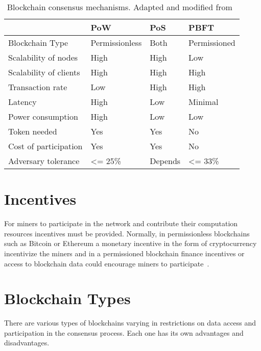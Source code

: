 \begin{table}[!ht]
  \centering
  \begin{tabular}{|l|l|l|l|}
    \hline
    & PoW &	PoS &	PBFT \\ \hline
    Blockchain Type &	Permissionless &	Both &	Permissioned \\ \hline
    Scalability of nodes &	High &	High &	Low \\ \hline
    Scalability of clients &	High &	High &	High \\ \hline
    Transaction rate &	Low &	High &	High \\ \hline
    Latency &	High &	Low &	Minimal \\ \hline
    Power consumption &	High &	Low &	Low \\ \hline
    Token needed &	Yes &	Yes &	No \\ \hline
    Cost of participation &	Yes &	Yes &	No \\ \hline
    Adversary tolerance &	<= 25\%	& Depends &	<= 33\% \\ \hline
  \end{tabular}
  \caption{Blockchain consensus mechanisms. Adapted and modified from~\cite{bl_consensus,Vukolić2016}}
  \label{table:blockchain_consensus}
\end{table}

\section{Incentives}\label{blockchain:incentives}

For miners to participate in the network and contribute their computation resources incentives must be provided.
Normally, in permissionless blockchains such as Bitcoin or Ethereum a monetary incentive in the form of cryptocurrency
incentivize the miners and in a permissioned blockchain finance incentives or access to blockchain data could encourage miners to participate~\cite{deloitte}.

\section{Blockchain Types}\label{blockchain:blockchain_types}

There are various types of blockchains varying in restrictions on data access and participation in the consensus process.
Each one has its own advantages and disadvantages.


